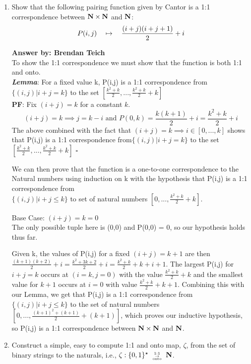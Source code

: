 \documentclass[12pt]{article}
\begin{document}
\noindent{}
\addtocounter{section}{1}

\begin{enumerate}
\item Show that the following pairing function given by Cantor is a 1:1
correspondence between $\mbox{\bf N}\times\mbox{\bf N}$ and $\mbox{\bf N}$:
\[ P(i,j) \quad\mapsto\quad {(i+j)(i+j+1)\over 2} + i\]

{\bf Answer by: Brendan Teich} \\
To show the 1:1 correspondence we must show that the function is both 1:1 and onto. \\
\textit{\textbf{Lemma}}: For a fixed value k, P(i,j) is a 1:1 correspondence from$\{(i,j) | i+j = k\}$ to the set $[\frac{k^2 + k}{2}, ...,  \frac{k^2 + k}{2} + k]$ \\
\textbf{PF}: Fix $(i+j) = k$ for a constant $k$.
\[(i+j) = k \implies j=k-i \text{ and } P(0,k) = \frac{k(k+1)}{2}+ i = \frac{k^2 + k}{2} + i\]
The above combined with the fact that $(i+j) = k \implies i \in [0,..., k]$ shows that  P(i,j) is a 1:1 correspondence from$\{(i,j) | i+j = k\}$ to the set $[\frac{k^2 + k}{2}, ...,  \frac{k^2 + k}{2} + k]$  $\square$

We can then prove that the function is a one-to-one correspondence to the Natural numbers using induction on k with the hypothesis that P(i,j) is a 1:1 correspondence from\\ $\{(i,j) | i+j \leq k\}$ to set of natural numbers $[0 ,..., \frac{k^2 + k}{2} + k]$.  

Base Case: $(i+j)=k=0$ \\
The only possible tuple here is (0,0) and P(0,0) = 0, so our hypothesis holds thus far. 

Given k, the values of P(i,j) for a fixed $(i+j) = k+1$ are then $\frac{(k+1)(k+2)}{2}+ i = \frac{k^2 + 3k + 2}{2} + i = \frac{k^2 + k}{2} + k + i + 1$.
The largest P(i,j) for $i+j=k$ occurs at $(i=k, j=0)$ with the value  $\frac{k^2 + k}{2} + k$ and the smallest value for $k+1$ occurs at $i=0$ with value $\frac{k^2 + k}{2} + k + 1$. Combining this with our Lemma, we get that P(i,j) is a 1:1 correspondence from $\{(i,j) | i+j \leq k\}$ to the set of natural numbers $[0,...,  \frac{(k+1)^2 + (k+1)}{2} + (k+1)]$, which proves our inductive hypothesis, so P(i,j) is a 1:1 correspondence between $\mbox{\bf N}\times\mbox{\bf N}$ and $\mbox{\bf N}$.

\item Construct a simple, easy to compute 1:1 and onto map, $\zeta$, from the set of binary strings
  to the naturals, i.e., $\zeta: \set{0,1}^\star\bijection\N$.


\end{enumerate}
\end{document}
